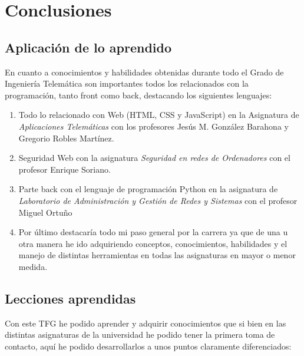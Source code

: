 \documentclass[a4paper, 12pt]{book}
\begin{document}

\cleardoublepage
\chapter{Conclusiones}
\label{chap:conclusiones}

\section{Aplicación de lo aprendido}
\label{sec:aplicacion}

En cuanto a conocimientos y habilidades obtenidas durante todo el Grado de Ingeniería Telemática son importantes todos los relacionados con la programación, tanto front como back, destacando los siguientes lenguajes:

\begin{enumerate}
  \item Todo lo relacionado con Web (HTML, CSS y JavaScript) en la Asignatura de \textit{Aplicaciones Telemáticas} con los profesores Jesús M. González Barahona y Gregorio Robles Martínez.
  \item Seguridad Web con la asignatura \textit{Seguridad en redes de Ordenadores} con el profesor Enrique Soriano.
  \item Parte back con el lenguaje de programación Python en la asignatura de \textit{Laboratorio de Administración y Gestión de Redes y Sistemas} con el profesor Miguel Ortuño
  \item Por último destacaría todo mi paso general por la carrera ya que de una u otra manera he ido adquiriendo conceptos, conocimientos, habilidades y el manejo de distintas herramientas en todas las asignaturas en mayor o menor medida.
\end{enumerate}


\section{Lecciones aprendidas}
\label{sec:lecciones_aprendidas}

Con este TFG he podido aprender y adquirir conocimientos que si bien en las distintas asignaturas de la universidad he podido tener la primera toma de contacto, aquí he podido desarrollarlos a unos puntos claramente diferenciados:
\end{document}
